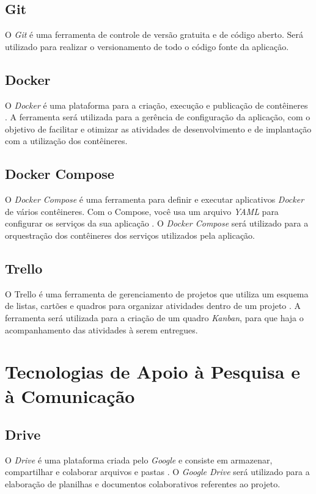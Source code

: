 \subsection{Git}
O \textit{Git} é uma ferramenta de controle de versão gratuita e de código aberto\cite{git}. Será utilizado para realizar o versionamento de todo o código fonte da aplicação.

\subsection{Docker}
O \textit{Docker} é uma plataforma para a criação, execução e publicação de contêineres \cite{docker}. A ferramenta será utilizada para a gerência de configuração da aplicação, com o objetivo de facilitar e otimizar as atividades de desenvolvimento e de implantação com a utilização dos contêineres.

\subsection{Docker Compose}
O \textit{Docker Compose} é uma ferramenta para definir e executar aplicativos \textit{Docker} de vários contêineres. Com o Compose, você usa um arquivo \textit{YAML} para configurar os serviços da sua aplicação \cite{docker-compose}. O \textit{Docker Compose} será utilizado para a orquestração dos contêineres dos serviços utilizados pela aplicação.

\subsection{Trello}
O Trello é uma ferramenta de gerenciamento de projetos que utiliza um esquema de listas, cartões e quadros para organizar atividades dentro de um projeto \cite{trello}. A ferramenta será utilizada para a criação de um quadro \textit{Kanban}, para que haja o acompanhamento das atividades à serem entregues.

\section{Tecnologias de Apoio à Pesquisa e à Comunicação}
\subsection{Drive}
O \textit{Drive} é uma plataforma criada pelo \textit{Google} e consiste em armazenar, compartilhar e colaborar arquivos e pastas \cite{drive}. O \textit{Google Drive} será utilizado para a elaboração de planilhas e documentos colaborativos referentes ao projeto.

